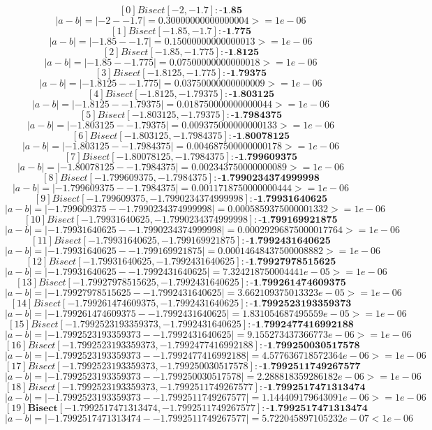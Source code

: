 \documentclass{article}
\begin{document}
    $$ [0] Bisect [-2, -1.7]: \textbf{-1.85} $$ $$ |a - b| = |-2 - -1.7| = 0.30000000000000004 >= 1e-06 $$
    $$ [1] Bisect [-1.85, -1.7]: \textbf{-1.775} $$ $$ |a - b| = |-1.85 - -1.7| = 0.15000000000000013 >= 1e-06 $$
    $$ [2] Bisect [-1.85, -1.775]: \textbf{-1.8125} $$ $$ |a - b| = |-1.85 - -1.775| = 0.07500000000000018 >= 1e-06 $$
    $$ [3] Bisect [-1.8125, -1.775]: \textbf{-1.79375} $$ $$ |a - b| = |-1.8125 - -1.775| = 0.03750000000000009 >= 1e-06 $$
    $$ [4] Bisect [-1.8125, -1.79375]: \textbf{-1.803125} $$ $$ |a - b| = |-1.8125 - -1.79375| = 0.018750000000000044 >= 1e-06 $$
    $$ [5] Bisect [-1.803125, -1.79375]: \textbf{-1.7984375} $$ $$ |a - b| = |-1.803125 - -1.79375| = 0.009375000000000133 >= 1e-06 $$
    $$ [6] Bisect [-1.803125, -1.7984375]: \textbf{-1.80078125} $$ $$ |a - b| = |-1.803125 - -1.7984375| = 0.004687500000000178 >= 1e-06 $$
    $$ [7] Bisect [-1.80078125, -1.7984375]: \textbf{-1.799609375} $$ $$ |a - b| = |-1.80078125 - -1.7984375| = 0.002343750000000089 >= 1e-06 $$
    $$ [8] Bisect [-1.799609375, -1.7984375]: \textbf{-1.7990234374999998} $$ $$ |a - b| = |-1.799609375 - -1.7984375| = 0.0011718750000000444 >= 1e-06 $$
    $$ [9] Bisect [-1.799609375, -1.7990234374999998]: \textbf{-1.79931640625} $$ $$ |a - b| = |-1.799609375 - -1.7990234374999998| = 0.0005859375000001332 >= 1e-06 $$
    $$ [10] Bisect [-1.79931640625, -1.7990234374999998]: \textbf{-1.799169921875} $$ $$ |a - b| = |-1.79931640625 - -1.7990234374999998| = 0.00029296875000017764 >= 1e-06 $$
    $$ [11] Bisect [-1.79931640625, -1.799169921875]: \textbf{-1.7992431640625} $$ $$ |a - b| = |-1.79931640625 - -1.799169921875| = 0.00014648437500008882 >= 1e-06 $$
    $$ [12] Bisect [-1.79931640625, -1.7992431640625]: \textbf{-1.79927978515625} $$ $$ |a - b| = |-1.79931640625 - -1.7992431640625| = 7.324218750004441e-05 >= 1e-06 $$
    $$ [13] Bisect [-1.79927978515625, -1.7992431640625]: \textbf{-1.799261474609375} $$ $$ |a - b| = |-1.79927978515625 - -1.7992431640625| = 3.662109375013323e-05 >= 1e-06 $$
    $$ [14] Bisect [-1.799261474609375, -1.7992431640625]: \textbf{-1.7992523193359373} $$ $$ |a - b| = |-1.799261474609375 - -1.7992431640625| = 1.831054687495559e-05 >= 1e-06 $$
    $$ [15] Bisect [-1.7992523193359373, -1.7992431640625]: \textbf{-1.7992477416992188} $$ $$ |a - b| = |-1.7992523193359373 - -1.7992431640625| = 9.155273437366773e-06 >= 1e-06 $$
    $$ [16] Bisect [-1.7992523193359373, -1.7992477416992188]: \textbf{-1.799250030517578} $$ $$ |a - b| = |-1.7992523193359373 - -1.7992477416992188| = 4.577636718572364e-06 >= 1e-06 $$
    $$ [17] Bisect [-1.7992523193359373, -1.799250030517578]: \textbf{-1.7992511749267577} $$ $$ |a - b| = |-1.7992523193359373 - -1.799250030517578| = 2.288818359286182e-06 >= 1e-06 $$
    $$ [18] Bisect [-1.7992523193359373, -1.7992511749267577]: \textbf{-1.7992517471313474} $$ $$ |a - b| = |-1.7992523193359373 - -1.7992511749267577| = 1.144409179643091e-06 >= 1e-06 $$
    $$ [19] \textbf{Bisect} [-1.7992517471313474, -1.7992511749267577]: \textbf{-1.7992517471313474} $$ $$ |a - b| = |-1.7992517471313474 - -1.7992511749267577| = 5.722045897105232e-07 < 1e-06 $$
\end{document}
